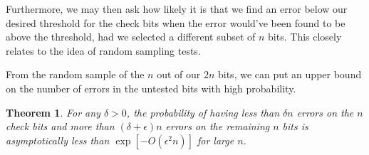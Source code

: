 \documentclass[12]{amsart}
\newtheorem{theorem}{Theorem}[section]
\begin{document}
Furthermore, we may then ask how likely it is that we find an error below our desired threshold for the check bits when the error would've been found to be above the threshold, had we selected a different subset of $n$ bits. This closely relates to the idea of random sampling tests\cite{text}. 

From the random sample of the $n$ out of our $2n$ bits, we can put an upper bound on the number of errors in the untested bits with high probability. \\

\begin{theorem}\label{thm}
For any $\delta > 0$, the probability of having less than $\delta n$ errors on the $n$ check bits and more than $(\delta+\epsilon)n$ errors on the remaining $n$ bits is asymptotically less than $\exp[-O(\epsilon^2n)]$ for large $n$.


\end{theorem}
\end{document}
